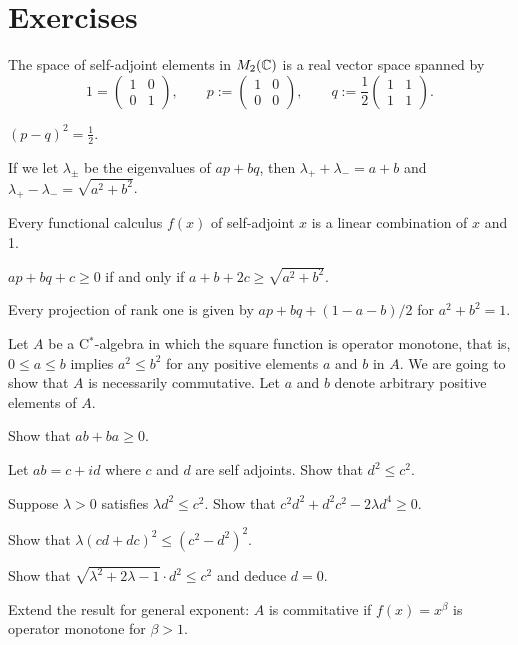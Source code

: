 \documentclass{../../large}
\begin{document}
\section*{Exercises}




\begin{prb}[Projections in $M_2(\C)$]
The space of self-adjoint elements in $M_2(\C)$ is a real vector space spanned by
\[1=\begin{pmatrix}1&0\\0&1\end{pmatrix},\qquad p:=\begin{pmatrix}1&0\\0&0\end{pmatrix},\qquad q:=\frac12\begin{pmatrix}1&1\\1&1\end{pmatrix}.\]
\begin{parts}
\item $(p-q)^2=\frac12$.
\item If we let $\lambda_\pm$ be the eigenvalues of $ap+bq$, then $\lambda_++\lambda_-=a+b$ and $\lambda_+-\lambda_-=\sqrt{a^2+b^2}$.
\item Every functional calculus $f(x)$ of self-adjoint $x$ is a linear combination of $x$ and 1.
\item $ap+bq+c\ge0$ if and only if $a+b+2c\ge\sqrt{a^2+b^2}$.
\item Every projection of rank one is given by $ap+bq+(1-a-b)/2$ for $a^2+b^2=1$.
\end{parts}
\end{prb}

\begin{prb}
Let $A$ be a C$^*$-algebra in which the square function is operator monotone, that is, $0\le a\le b$ implies $a^2\le b^2$ for any positive elements $a$ and $b$ in $A$.
We are going to show that $A$ is necessarily commutative.
Let $a$ and $b$ denote arbitrary positive elements of $A$.
\begin{parts}
\item
Show that $ab+ba\ge0$.
\item
Let $ab=c+id$ where $c$ and $d$ are self adjoints.
Show that $d^2\le c^2$.
\item
Suppose $\lambda>0$ satisfies $\lambda d^2\le c^2$.
Show that $c^2d^2+d^2c^2-2\lambda d^4\ge0$.
\item
Show that $\lambda(cd+dc)^2\le(c^2-d^2)^2$.
\item
Show that $\sqrt{\lambda^2+2\lambda-1}\cdot d^2\le c^2$ and deduce $d=0$.
\item
Extend the result for general exponent: $A$ is commitative if $f(x)=x^\beta$ is operator monotone for $\beta>1$.
\end{parts}
\end{prb}
\end{document}
